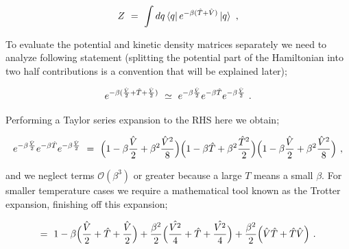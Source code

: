 \documentclass{article}
\begin{document}
\begin{equation} \label{eq:1}
Z  \hspace{0.125cm} = \hspace{0.125cm} \int dq \bra{q} e^{-\beta ( \hat{T} + \hat{V} )}\ket{q} \hspace{0.125cm} , 
\end{equation}

To evaluate the potential and kinetic density matrices separately we need to analyze following statement (splitting the potential part of the Hamiltonian into two half contributions is a convention that will be explained later); 

\begin{equation} \label{eq:1}
e^{-\beta ( \frac{\hat{V}}{2} + \hat{T} + \frac{\hat{V}}{2} )} \hspace{0.125cm} \simeq \hspace{0.125cm} e^{-\beta \frac{\hat{V}}{2}} e^{-\beta \hat{T}} e^{-\beta \frac{\hat{V}}{2}} \hspace{0.125cm} .
\end{equation}

Performing a Taylor series expansion to the RHS here we obtain;

\begin{equation} \label{eq:1}
e^{-\beta \frac{\hat{V}}{2}} e^{-\beta \hat{T}} e^{-\beta \frac{\hat{V}}{2}} \hspace{0.125cm} = \hspace{0.125cm} \Big( 1 - \beta \frac{\hat{V}}{2} + \beta^2 \frac{\hat{V}^2}{8} \Big) \Big( 1 - \beta \hat{T} + \beta^2 \frac{\hat{T}^2}{2} \Big) \Big( 1 - \beta \frac{\hat{V}}{2} + \beta^2 \frac{\hat{V}^2}{8} \Big) \hspace{0.125cm} ,
\end{equation}

and we neglect terms \begin{math} \mathcal{O}(\beta^3) \end{math} or greater because a large \begin{math} T \end{math} means a small \begin{math} \beta \end{math}. For smaller temperature cases we require a mathematical tool known as the Trotter expansion, finishing off this expansion;

\begin{equation} \label{eq:1}
= \hspace{0.125cm} 1 - \beta \Big( \frac{\hat{V}}{2} + \hat{T} + \frac{\hat{V}}{2} \Big) + \frac{\beta^2}{2} \Big( \frac{\hat{V^2}}{4} + \hat{T} + \frac{\hat{V^2}}{4} \Big) +  \frac{\beta^2}{2} \Big( \hat{V} \hat{T} + \hat{T} \hat{V} \Big) \hspace{0.125cm} .
\end{equation}
\end{document}
